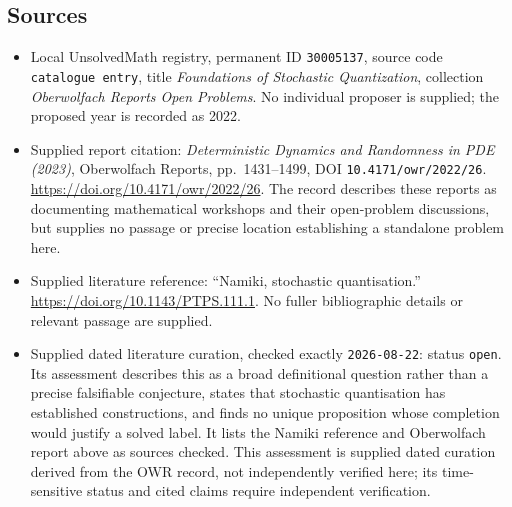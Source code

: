 \documentclass[11pt]{article}
\begin{document}
\subsection{Sources}
\begin{itemize}
\item Local UnsolvedMath registry, permanent ID \texttt{30005137}, source code \texttt{catalogue entry}, title \emph{Foundations of Stochastic Quantization}, collection \emph{Oberwolfach Reports Open Problems}. No individual proposer is supplied; the proposed year is recorded as 2022.
\item Supplied report citation: \emph{Deterministic Dynamics and Randomness in PDE (2023)}, Oberwolfach Reports, pp.\ 1431--1499, DOI \texttt{10.4171/owr/2022/26}. \url{https://doi.org/10.4171/owr/2022/26}. The record describes these reports as documenting mathematical workshops and their open-problem discussions, but supplies no passage or precise location establishing a standalone problem here.
\item Supplied literature reference: ``Namiki, stochastic quantisation.'' \url{https://doi.org/10.1143/PTPS.111.1}. No fuller bibliographic details or relevant passage are supplied.
\item Supplied dated literature curation, checked exactly \texttt{2026-08-22}: status \texttt{open}. Its assessment describes this as a broad definitional question rather than a precise falsifiable conjecture, states that stochastic quantisation has established constructions, and finds no unique proposition whose completion would justify a solved label. It lists the Namiki reference and Oberwolfach report above as sources checked. This assessment is supplied dated curation derived from the OWR record, not independently verified here; its time-sensitive status and cited claims require independent verification.
\end{itemize}
\end{document}
